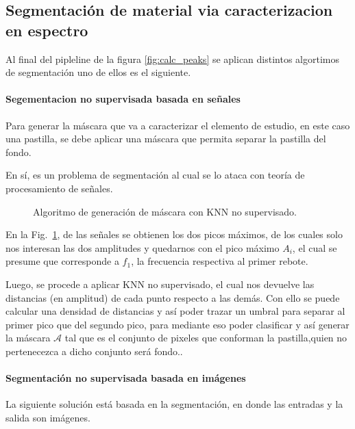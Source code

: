 \subsection{Segmentación de material via caracterizacion en espectro}

Al final del pipleline de la figura \ref{fig:calc_peaks} se aplican distintos algortimos de segmentación uno de ellos es el siguiente.

\paragraph{Segementacion no supervisada basada en señales}

Para generar la máscara que va a caracterizar el elemento de estudio, en este caso una pastilla, se debe aplicar una máscara que permita separar la pastilla del fondo.

En sí, es un problema de segmentación al cual se lo ataca con teoría de procesamiento de señales.

\begin{figure}[H]
    \centering
    \resizebox{0.8\textwidth}{!}{%
    }
    \caption{Algoritmo de generación de máscara con KNN no supervisado.}
    \label{fig:maskv0}
\end{figure}

En la Fig.~\ref{fig:maskv0}, de las señales se obtienen los dos picos máximos, de los cuales solo nos interesan las dos amplitudes y quedarnos con el pico máximo $A_i$, el cual se presume que corresponde a \(f_1\), la frecuencia respectiva al primer rebote.

Luego, se procede a aplicar KNN no supervisado, el cual nos devuelve las distancias (en amplitud) de cada punto respecto a las demás. Con ello se puede calcular una densidad de distancias y así poder trazar un umbral para separar al primer pico que del segundo pico, para mediante eso poder clasificar y así generar la máscara $\mathcal{A}$ tal que es el conjunto de pixeles que conforman la pastilla,quien no pertenecezca a dicho conjunto será fondo..



\paragraph{Segmentación no supervisada basada en imágenes}

La siguiente solución está basada en la segmentación, en donde las entradas y la salida son imágenes.

